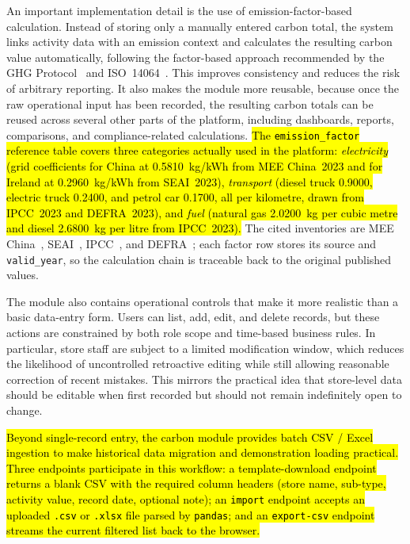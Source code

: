 \documentclass[11pt,a4paper]{article}
\newcommand{\new}[1]{\hl{#1}}
\begin{document}
An important implementation detail is the use of emission-factor-based calculation. Instead of storing only a manually entered carbon total, the system links activity data with an emission context and calculates the resulting carbon value automatically, following the factor-based approach recommended by the GHG Protocol~\cite{ghgprotocol} and ISO~14064~\cite{iso14064}. This improves consistency and reduces the risk of arbitrary reporting. It also makes the module more reusable, because once the raw operational input has been recorded, the resulting carbon totals can be reused across several other parts of the platform, including dashboards, reports, comparisons, and compliance-related calculations. \new{The \texttt{emission\_factor} reference table covers three categories actually used in the platform: \emph{electricity} (grid coefficients for China at 0.5810~kg/kWh from MEE China~2023 and for Ireland at 0.2960~kg/kWh from SEAI~2023), \emph{transport} (diesel truck 0.9000, electric truck 0.2400, and petrol car 0.1700, all per kilometre, drawn from IPCC~2023 and DEFRA~2023), and \emph{fuel} (natural gas 2.0200~kg per cubic metre and diesel 2.6800~kg per litre from IPCC~2023).} The cited inventories are MEE China~\cite{mee2023}, SEAI~\cite{seai2023}, IPCC~\cite{ipcc2023}, and DEFRA~\cite{defra2023}; each factor row stores its source and \texttt{valid\_year}, so the calculation chain is traceable back to the original published values.

The module also contains operational controls that make it more realistic than a basic data-entry form. Users can list, add, edit, and delete records, but these actions are constrained by both role scope and time-based business rules. In particular, store staff are subject to a limited modification window, which reduces the likelihood of uncontrolled retroactive editing while still allowing reasonable correction of recent mistakes. This mirrors the practical idea that store-level data should be editable when first recorded but should not remain indefinitely open to change.

\new{Beyond single-record entry, the carbon module provides batch CSV / Excel ingestion to make historical data migration and demonstration loading practical. Three endpoints participate in this workflow: a template-download endpoint returns a blank CSV with the required column headers (store name, sub-type, activity value, record date, optional note); an \texttt{import} endpoint accepts an uploaded \texttt{.csv} or \texttt{.xlsx} file parsed by \texttt{pandas}; and an \texttt{export-csv} endpoint streams the current filtered list back to the browser.}
\end{document}
